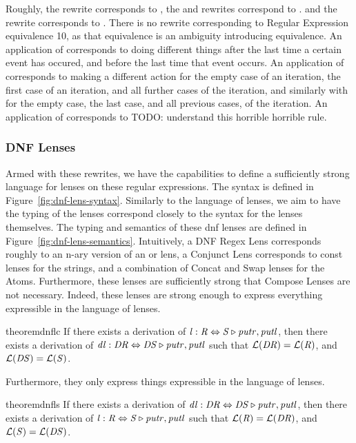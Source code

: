 Roughly, the \AtomSumstarRule{} rewrite corresponds to \SumstarRule{},
the \AtomUnrollstarLeftRule{} and \AtomUnrollstarRightRule{} rewrites correspond to \ProductstarRule{}.
and the \DicyclicRewriteStarRule{} rewrite corresponds to \DicyclicityRule{}.
There is no rewrite corresponding to Regular Expression equivalence 10, as that
equivalence is an ambiguity introducing equivalence.
An application of \AtomSumstarRule{} corresponds to doing different things after the last time a certain event has occured, and before the last time that event occurs.
An application of \AtomUnrollstarLeftRule{} corresponds to making a different action for
the empty case of an iteration, the first case of an iteration, and all further cases of the iteration,
and similarly with \AtomUnrollstarRightRule{} for the empty case, the last case, and all previous cases, of the iteration.
An application of \DicyclicRewriteStarRule{} corresponds to TODO: understand this
horrible horrible rule.

\subsubsection{DNF Lenses}


Armed with these rewrites, we have the capabilities to define a sufficiently
strong language for lenses on these regular expressions.
The syntax is defined in Figure~\ref{fig:dnf-lens-syntax}.
Similarly to the language of lenses, we aim to have the typing of the lenses
correspond closely to the syntax for the lenses themselves.
The typing and semantics of these dnf lenses are defined in Figure~\ref{fig:dnf-lens-semantics}.
Intuitively, a DNF Regex Lens corresponds roughly to an n-ary version of an or lens,
a Conjunct Lens corresponds to const lenses for the strings, and a combination of
Concat and Swap lenses for the Atoms.
Furthermore, these lenses are sufficiently strong that Compose Lenses are not
necessary.
Indeed, these lenses are strong enough to express everything expressible in the language of lenses.
\begin{restatable}{theorem}{dnflc}
\label{thm:completeness-dnf-lenses}
If there exists a derivation of $\mathit{l} : \mathit{R} \Leftrightarrow \mathit{S} \triangleright \mathit{putr},\mathit{putl}$,
then there exists a derivation of $\mathit{dl} : \mathit{DR} \Leftrightarrow \mathit{DS} \triangleright \mathit{putr},\mathit{putl}$ such that
$\mathcal{L}(\mathit{DR})=\mathcal{L}(\mathit{R})$, and
$\mathcal{L}(\mathit{DS})=\mathcal{L}(\mathit{S})$.
\end{restatable}
Furthermore, they only express things expressible in the language of lenses.
\begin{restatable}{theorem}{dnfls}
\label{thm:soundness-dnf-lenses}
If there exists a derivation of $\mathit{dl} : \mathit{DR} \Leftrightarrow \mathit{DS} \triangleright \mathit{putr},\mathit{putl}$,
then there exists a derivation of $\mathit{l} : \mathit{R} \Leftrightarrow \mathit{S} \triangleright \mathit{putr},\mathit{putl}$ such that
$\mathcal{L}(\mathit{R})=\mathcal{L}(\mathit{DR})$, and
$\mathcal{L}(\mathit{S})=\mathcal{L}(\mathit{DS})$.
\end{restatable}

